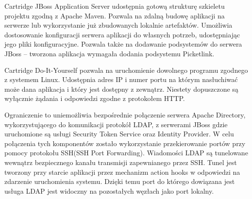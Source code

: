 	Cartridge JBoss Application Server udostępnia gotową strukturę szkieletu projektu zgodną z Apache Maven. Pozwala na zdalną budowę aplikacji na serwerze lub wykorzystanie już zbudowanych lokalnie artefaktów. Umożliwia dostosowanie konfiguracji serwera aplikacji do własnych potrzeb, udostępniając jego pliki konfiguracyjne. Pozwala także na dodawanie podsystemów do serwera JBoss – tworzona aplikacja wymagała dodania podsystemu Picketlink.
	

	Cartridge Do-It-Yourself pozwala na uruchomienie dowolnego programu zgodnego z systemem Linux. Udostępnia adres IP i numer portu na którym nasłuchiwać może dana aplikacja i który jest dostępny z zewnątrz. Niestety dopuszczone są wyłącznie żądania i odpowiedzi zgodne z protokołem HTTP. 
	
	Ograniczenie to uniemożliwia bezpośrednie połączenie serwera Apache Directory, wykorzystującego do komunikacji protokół LDAP,  z serwerami JBoss gdzie uruchomione są usługi Security Token Service oraz Identity Provider. W celu połączenia tych komponentów zostało wykorzystanie przekierowanie portów przy pomocy protokołu SSH(SSH Port Forwarding). Wiadomości LDAP są tunelowane wewnątrz bezpiecznego kanału transmisji zapewnianego przez SSH. Tunel jest tworzony przy starcie aplikacji przez mechanizm action hooks w odpowiedzi na zdarzenie uruchomienia systemu.  Dzięki temu port do którego dowiązana jest usługa LDAP jest widoczny na pozostałych węzłach jako port lokalny. 